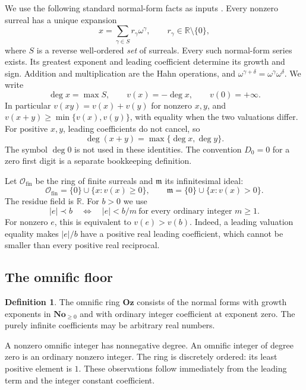 \documentclass[11pt,a4paper]{article}
\numberwithin{equation}{section}
\theoremstyle{definition}
\newtheorem{definition}[theorem]{Definition}
\theoremstyle{remark}
\newcommand{\No}{\mathbf{No}}
\newcommand{\Oz}{\mathbf{Oz}}
\newcommand{\R}{\mathbb R}
\newcommand{\Ofin}{\mathcal O_{\mathrm{fin}}}%
\newcommand{\mm}{\mathfrak m}
\newcommand{\dgr}{\operatorname{deg}}
\begin{document}
We use the following standard normal-form facts as inputs
\cite{Gonshor}. Every nonzero surreal has a unique expansion
\begin{equation}\label{ocf:eq:normal}
 x=\sum_{\gamma\in S}r_\gamma\omega^\gamma,
 \qquad r_\gamma\in\R\setminus\{0\},
\end{equation}
where $S$ is a reverse well-ordered \emph{set} of surreals. Every such
normal-form series exists. Its greatest exponent and leading coefficient
determine its growth and sign. Addition and multiplication are the Hahn
operations, and $\omega^{\gamma+\delta}=\omega^\gamma\omega^\delta$.
We write
\[
 \dgr x=\max S,\qquad v(x)=-\dgr x,\qquad v(0)=+\infty.
\]
In particular $v(xy)=v(x)+v(y)$ for nonzero $x,y$, and
$v(x+y)\ge\min\{v(x),v(y)\}$, with equality when the two valuations differ.
For positive $x,y$, leading coefficients do not cancel, so
\begin{equation}\label{ocf:eq:positivedegree}
 \dgr(x+y)=\max\{\dgr x,\dgr y\}.
\end{equation}
The symbol $\dgr0$ is not used in these identities. The convention
$D_0=0$ for a zero first digit is a separate bookkeeping definition.

Let $\Ofin$ be the ring of finite surreals and $\mm$ its infinitesimal ideal:
\[
 \Ofin=\{0\}\cup\{x:v(x)\ge0\},\qquad
 \mm=\{0\}\cup\{x:v(x)>0\}.
\]
The residue field is $\R$. For $b>0$ we use
\begin{equation}\label{ocf:eq:little}
 |e|\prec b\quad\Longleftrightarrow\quad
 |e|<b/m\ \text{for every ordinary integer }m\ge1.
\end{equation}
For nonzero $e$, this is equivalent to $v(e)>v(b)$. Indeed, a leading
valuation equality makes $|e|/b$ have a positive real leading coefficient,
which cannot be smaller than every positive real reciprocal.

\subsection{The omnific floor}

\begin{definition}\label{ocf:def:Oz}
The omnific ring $\Oz$ consists of the normal forms with growth exponents
in $\No_{\ge0}$ and with ordinary integer coefficient at exponent zero.
The purely infinite coefficients may be arbitrary real numbers.
\end{definition}

A nonzero omnific integer has nonnegative degree. An omnific integer of
degree zero is an ordinary nonzero integer. The ring is discretely ordered:
its least positive element is $1$. These observations follow immediately
from the leading term and the integer constant coefficient.
\end{document}
